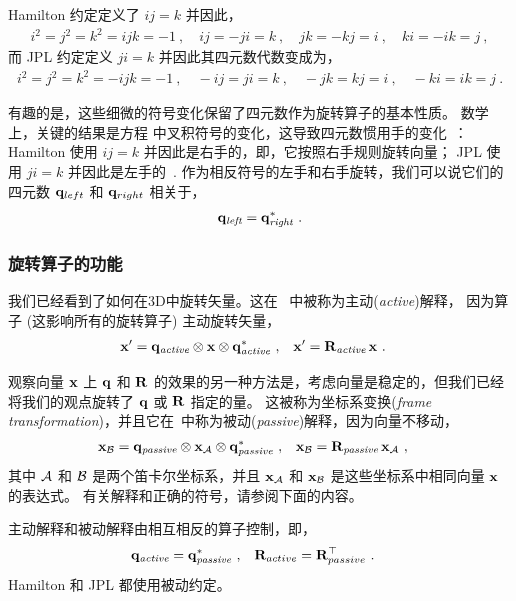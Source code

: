Hamilton 约定定义了 $ij=k$ 并因此，
%
\begin{align}
i^2 = j^2 = k^2 = ijk = -1~,\quad ij = -ji = k~, \quad jk = -kj = i~, \quad ki = -ik = j~,
\end{align}
%
而 JPL 约定定义 $ji=k$ 并因此其四元数代数变成为，
%
\begin{align}
i^2 = j^2 = k^2 = -ijk = -1~,\quad -ij = ji = k~, \quad -jk = kj = i~, \quad -ki = ik = j~.
\end{align}

有趣的是，这些细微的符号变化保留了四元数作为旋转算子的基本性质。 
数学上，关键的结果是方程  中叉积符号的变化，这导致四元数惯用手的变化~\citep{SHUSTER-93}：
Hamilton 使用 $ij=k$ 并因此是右手的，即，它按照右手规则旋转向量； JPL 使用 $ji=k$ 并因此是左手的~\citep{TRAWNY-05-QUAT}. 
作为相反符号的左手和右手旋转，我们可以说它们的四元数 ${\bf q}_{left}$ 和 ${\bf q}_{right}$ 相关于，
%
\begin{align}
{\bf q}_{\textit{left}}= {\bf q}_{\textit{right}}^*~.
\end{align}



\subsubsection{旋转算子的功能}

我们已经看到了如何在3D中旋转矢量。这在~\citep{SHUSTER-93} 中被称为主动(\emph{active})解释， 
因为算子 (这影响所有的旋转算子) 主动旋转矢量，
%
\begin{align}
{\bf x}' &={\bf q}_{\textit{active}}\otimes{\bf x}\otimes{\bf q}_{\textit{active}}^* ~,
& 
{\bf x}' &= {\bf R}_{\textit{active}}\,{\bf x}~.
\end{align}

观察向量 ${\bf x}$ 上 ${\bf q}$ 和 ${\bf R}$ 的效果的另一种方法是，考虑向量是稳定的，但我们已经将我们的观点旋转了 ${\bf q}$ 或 ${\bf R}$ 指定的量。 
这被称为坐标系变换(\emph{frame transformation})，并且它在~\citep{SHUSTER-93}中称为被动(\emph{passive})解释，因为向量不移动，
%
\begin{align}
{\bf x}_{\mathcal{B}} &= {\bf q}_{\textit{passive}}\otimes{\bf x}_{\mathcal{A}}\otimes{\bf q}_{\textit{passive}}^*~,
&
{\bf x}_{\mathcal{B}}&={\bf R}_{\textit{passive}}\,{\bf x}_{\mathcal{A}}~,
\end{align}
%
其中 $\mathcal{A}$ 和 $\mathcal{B}$ 是两个笛卡尔坐标系，并且 ${\bf x}_{\mathcal{A}}$ 和 ${\bf x}_{\mathcal{B}}$ 是这些坐标系中相同向量 ${\bf x}$ 的表达式。 
有关解释和正确的符号，请参阅下面的内容。


主动解释和被动解释由相互相反的算子控制，即， 
%
\begin{align*}
{\bf q}_{\textit{active}} &= {\bf q}_{\textit{passive}}^* ~,
& 
{\bf R}_{active} &= {\bf R}_{passive}^{\top} ~.
\end{align*}
%
Hamilton 和 JPL 都使用被动约定。 

